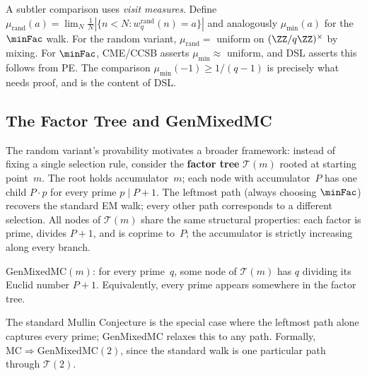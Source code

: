 A subtler comparison uses \emph{visit measures}.  Define
$\mu_{\mathrm{rand}}(a) = \lim_{N} \frac{1}{N}|\{n < N :
w_q^{\mathrm{rand}}(n) = a\}|$ and analogously
$\mu_{\min}(a)$ for the $\minFac$ walk.  For the random variant,
$\mu_{\mathrm{rand}} = $ uniform on $(\ZZ/q\ZZ)^\times$ by mixing.
For $\minFac$, CME/CCSB asserts $\mu_{\min} \approx$ uniform, and
DSL asserts this follows from PE\@.  The comparison
$\mu_{\min}(-1) \geq 1/(q{-}1)$ is precisely what needs proof, and is
the content of DSL\@.

\subsection{The Factor Tree and GenMixedMC}
\label{sec:factor-tree}

The random variant's provability motivates a broader framework:
instead of fixing a single selection rule, consider the
\textbf{factor tree} $\mathcal{T}(m)$ rooted at starting point~$m$.
The root holds accumulator~$m$; each node with accumulator~$P$ has
one child $P \cdot p$ for every prime $p \mid P{+}1$.
The leftmost path (always choosing $\minFac$) recovers the standard EM
walk; every other path corresponds to a different selection.
All nodes of $\mathcal{T}(m)$ share the same structural properties:
each factor is prime, divides $P{+}1$, and is coprime to~$P$; the
accumulator is strictly increasing along every branch.

\begin{definition}[GenMixedMC]
\label{def:gen-mixed-mc}
$\mathrm{GenMixedMC}(m)$: for every prime~$q$, some node of
$\mathcal{T}(m)$ has $q$ dividing its Euclid number $P{+}1$.
Equivalently, every prime appears somewhere in the factor tree.
\end{definition}

\noindent
The standard Mullin Conjecture is the special case where the
leftmost path alone captures every prime; GenMixedMC relaxes this to
any path.  Formally, $\mathrm{MC} \Longrightarrow
\mathrm{GenMixedMC}(2)$, since the standard walk is one particular
path through $\mathcal{T}(2)$.

